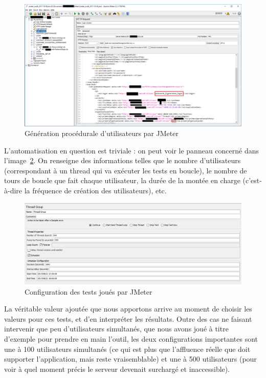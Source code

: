 \begin{figure}
  \centering
  \caption{Génération procédurale d'utilisateurs par JMeter}
  \label{fig:jmeter_user}
  \includegraphics[width=\textwidth]{images/jmeter_login}
\end{figure}

L'automatisation en question est triviale : on peut voir le panneau concerné dans l'image~\ref{fig:jmeter_config}. On renseigne des informations telles que le nombre d'utilisateurs (correspondant à un thread qui va exécuter les tests en boucle), le nombre de tours de boucle que fait chaque utilisateur, la durée de la montée en charge (c'est-à-dire la fréquence de création des utilisateurs), etc. 

\begin{figure}
  \centering
  \caption{Configuration des tests joués par JMeter}
  \label{fig:jmeter_config}
  \includegraphics[width=\textwidth]{images/jmeter_config}
\end{figure}

La véritable valeur ajoutée que nous apportons arrive au moment de choisir les valeurs pour ces tests, et d'en interpréter les résultats. Outre des cas ne faisant intervenir que peu d'utilisateurs simultanés, que nous avons joué à titre d'exemple pour prendre en main l'outil, les deux configurations importantes sont une à 100 utilisateurs simultanés (ce qui est plus que l'affluence réelle que doit supporter l'application, mais reste vraisemblable) et une à 500 utilisateurs (pour voir à quel moment précis le serveur devenait surchargé et inaccessible). 

